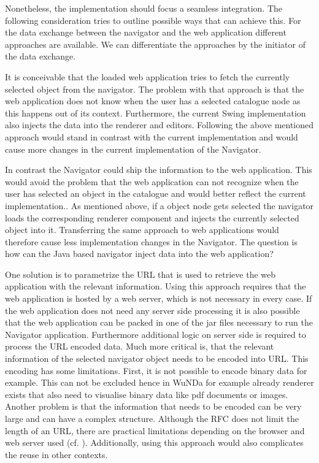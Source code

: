 Nonetheless, the implementation should focus a seamless integration.
The following consideration tries to outline possible ways that can achieve this.
For the data exchange between the navigator and the web application different approaches are available.
We can differentiate the approaches by the initiator of the data exchange.

It is conceivable that the loaded web application tries to fetch the currently selected object from the navigator.
The problem with that approach is that the web application does not know when the user has a selected catalogue node as this happens out of its context. 
Furthermore, the current Swing implementation also injects the data into the renderer and editors. 
Following the above mentioned approach would stand in contrast with the current implementation and would cause more changes in the current implementation of the Navigator.

In contrast the Navigator could ship the information to the web application.
This would avoid the problem that the web application can not recognize when the user has selected an object in the catalogue and would better reflect the current implementation..
As mentioned above, if a object node gets selected the navigator loads the corresponding renderer component and injects the currently selected object into it.
Transferring the same approach to web applications would therefore cause less implementation changes in the Navigator.
The question is how can the Java based navigator inject data into the web application? 

One solution is to parametrize the URL that is used to retrieve the web application with the relevant information.
Using this approach requires that the web application is hosted by a web server, which is not necessary in every case.
If the web application does not need any server side processing it is also possible that the web application can be packed in one of the jar files necessary to run the Navigator application.
Furthermore additional logic on server side is required to process the URL encoded data.
Much more critical is, that the relevant information of the selected navigator object needs to be encoded into URL.
This encoding has some limitations.
First, it is not possible to encode binary data for example.
This can not be excluded hence in WuNDa for example already renderer exists that also need to visualise binary data like pdf documents or images.
Another problem is that the information that needs to be encoded can be very large and can have a complex structure.
Although the RFC \autocite{conception:rfc-uri}  does not limit the length of an URL, there are practical limitations depending on the browser and web server used (cf. \autocite{conception:uri-length}).
Additionally, using this approach would also complicates the reuse in other contexts.

